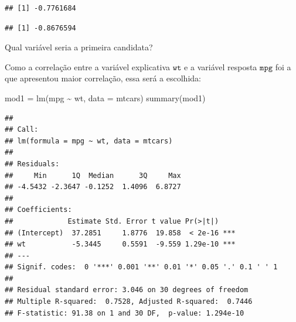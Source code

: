 \documentclass[
]{book}
\newenvironment{Shaded}{\begin{snugshade}}{\end{snugshade}}
\newcommand{\AttributeTok}[1]{\textcolor[rgb]{0.77,0.63,0.00}{#1}}
\newcommand{\FunctionTok}[1]{\textcolor[rgb]{0.00,0.00,0.00}{#1}}
\newcommand{\NormalTok}[1]{#1}
\newcommand{\OtherTok}[1]{\textcolor[rgb]{0.56,0.35,0.01}{#1}}
\newcommand{\SpecialCharTok}[1]{\textcolor[rgb]{0.00,0.00,0.00}{#1}}
\begin{document}
\begin{Shaded}
\end{Shaded}

\begin{verbatim}
## [1] -0.7761684
\end{verbatim}

\begin{Shaded}
\end{Shaded}

\begin{verbatim}
## [1] -0.8676594
\end{verbatim}

Qual variável seria a primeira candidata?

Como a correlação entre a variável explicativa \(\texttt{wt}\) e a variável resposta \(\texttt{mpg}\) foi a que apresentou maior correlação, essa será a escolhida:

\begin{Shaded}
\begin{Highlighting}[]
\NormalTok{mod1 }\OtherTok{=} \FunctionTok{lm}\NormalTok{(mpg }\SpecialCharTok{\textasciitilde{}}\NormalTok{ wt, }\AttributeTok{data =}\NormalTok{ mtcars)}
\FunctionTok{summary}\NormalTok{(mod1)}
\end{Highlighting}
\end{Shaded}

\begin{verbatim}
## 
## Call:
## lm(formula = mpg ~ wt, data = mtcars)
## 
## Residuals:
##     Min      1Q  Median      3Q     Max 
## -4.5432 -2.3647 -0.1252  1.4096  6.8727 
## 
## Coefficients:
##             Estimate Std. Error t value Pr(>|t|)    
## (Intercept)  37.2851     1.8776  19.858  < 2e-16 ***
## wt           -5.3445     0.5591  -9.559 1.29e-10 ***
## ---
## Signif. codes:  0 '***' 0.001 '**' 0.01 '*' 0.05 '.' 0.1 ' ' 1
## 
## Residual standard error: 3.046 on 30 degrees of freedom
## Multiple R-squared:  0.7528, Adjusted R-squared:  0.7446 
## F-statistic: 91.38 on 1 and 30 DF,  p-value: 1.294e-10
\end{verbatim}
\end{document}
